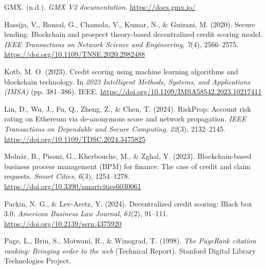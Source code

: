 \hangindent=0.5in  GMX. (n.d.). \textit{GMX V2 documentation}. \href{https://docs.gmx.io/}{https://docs.gmx.io/}\par

\hangindent=0.5in  Hassija, V., Bansal, G., Chamola, V., Kumar, N., \& Guizani, M. (2020). Secure lending: Blockchain and prospect theory-based decentralized credit scoring model. \textit{IEEE Transactions on Network Science and Engineering}, \textit{7}(4), 2566--2575. \href{https://doi.org/10.1109/TNSE.2020.2982488}{https://doi.org/10.1109/TNSE.2020.2982488}\par

\hangindent=0.5in  Kotb, M. O. (2023). Credit scoring using machine learning algorithms and blockchain technology. In \textit{2023 Intelligent Methods, Systems, and Applications (IMSA)} (pp. 381--386). IEEE. \href{https://doi.org/10.1109/IMSA58542.2023.10217411}{https://doi.org/10.1109/IMSA58542.2023.10217411}\par

\hangindent=0.5in  Lin, D., Wu, J., Fu, Q., Zheng, Z., \& Chen, T. (2024). RiskProp: Account risk rating on Ethereum via de-anonymous score and network propagation. \textit{IEEE Transactions on Dependable and Secure Computing}, \textit{22}(3), 2132--2145. \href{https://doi.org/10.1109/TDSC.2024.3475825}{https://doi.org/10.1109/TDSC.2024.3475825}\par

\hangindent=0.5in  Moln\'{a}r, B., Pisoni, G., Kherbouche, M., \& Zghal, Y. (2023). Blockchain-based business process management (BPM) for finance: The case of credit and claim requests. \textit{Smart Cities}, \textit{6}(3), 1254--1278. \href{https://doi.org/10.3390/smartcities6030061}{https://doi.org/10.3390/smartcities6030061}\par

\hangindent=0.5in  Packin, N. G., \& Lev-Aretz, Y. (2024). Decentralized credit scoring: Black box 3.0. \textit{American Business Law Journal}, \textit{61}(2), 91--111. \href{https://doi.org/10.2139/ssrn.4375920}{https://doi.org/10.2139/ssrn.4375920}\par

\hangindent=0.5in  Page, L., Brin, S., Motwani, R., \& Winograd, T. (1998). \textit{The PageRank citation ranking: Bringing order to the web} (Technical Report). Stanford Digital Library Technologies Project.\par

